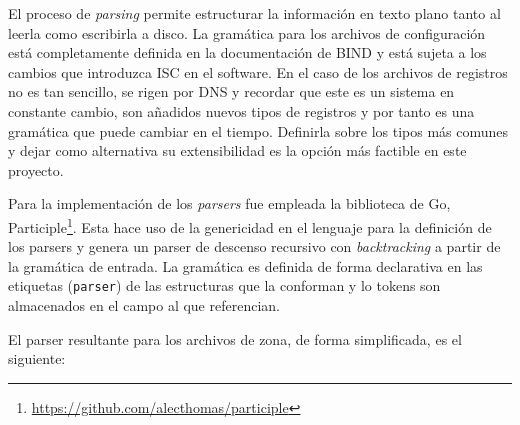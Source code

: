 El proceso de \textit{parsing} permite estructurar la información en texto plano tanto al leerla como escribirla a disco. La gramática para los archivos de configuración está completamente definida en la documentación de BIND y está sujeta a los cambios que introduzca ISC en el software. En el caso de los archivos de registros no es tan sencillo, se rigen por DNS y recordar que este es un sistema en constante cambio, son añadidos nuevos tipos de registros y por tanto es una gramática que puede cambiar en el tiempo. Definirla sobre los tipos más comunes y dejar como alternativa su extensibilidad es la opción más factible en este proyecto.

Para la implementación de los \textit{parsers} fue empleada la biblioteca de Go, Participle\footnote{\url{https://github.com/alecthomas/participle}}. Esta hace uso de la genericidad en el lenguaje para la definición de los parsers y genera un parser de descenso recursivo con \textit{backtracking} a partir de la gramática de entrada. La gramática es definida de forma declarativa en las etiquetas (\verb|parser|) de las estructuras que la conforman y lo tokens son almacenados en el campo al que referencian.

El parser resultante para los archivos de zona, de forma simplificada, es el siguiente:

